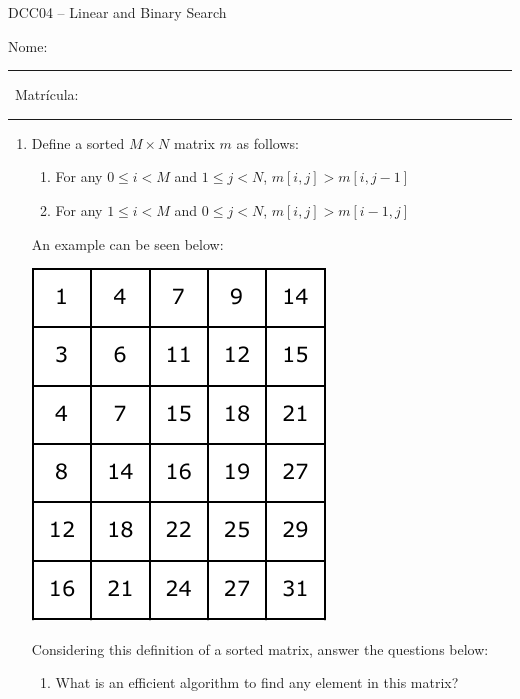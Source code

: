 \documentclass[12pt]{article}
\begin{document}
\begin{center}
\Large{DCC04 -- Linear and Binary Search}
\end{center}

\vspace{1cm}

\noindent
Nome: \rule{8cm}{0.01in} \ Matr\'{i}cula: \rule{3cm}{0.01in}

\vspace{1cm}


\begin{enumerate}

\item Define a sorted $M\times N$ matrix $m$ as follows:
\begin{enumerate}
\item For any $0 \leq i < M$ and $1 \leq j < N$, $m[i, j] > m[i, j-1]$
\item For any $1 \leq i < M$ and $0 \leq j < N$, $m[i, j] > m[i-1, j]$
\end{enumerate}
An example can be seen below:

\includegraphics[scale=1]{images/sortedMatrix}

Considering this definition of a sorted matrix, answer the questions below:

\begin{enumerate}
\item What is an efficient algorithm to find any element in this matrix?

\vspace{1cm}


\end{enumerate}
\end{enumerate}
\end{document}
